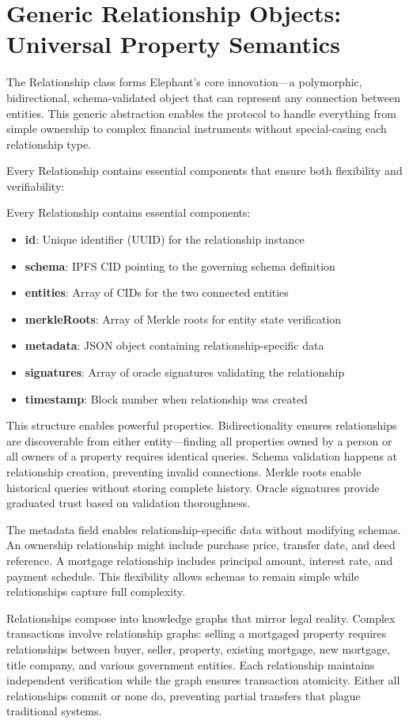 \section{Generic Relationship Objects: Universal Property Semantics}

The Relationship class forms Elephant's core innovation—a polymorphic, bidirectional, schema-validated object that can represent any connection between entities. This generic abstraction enables the protocol to handle everything from simple ownership to complex financial instruments without special-casing each relationship type.

Every Relationship contains essential components that ensure both flexibility and verifiability:

Every Relationship contains essential components:
\begin{itemize}
\item \textbf{id}: Unique identifier (UUID) for the relationship instance
\item \textbf{schema}: IPFS CID pointing to the governing schema definition
\item \textbf{entities}: Array of CIDs for the two connected entities
\item \textbf{merkleRoots}: Array of Merkle roots for entity state verification
\item \textbf{metadata}: JSON object containing relationship-specific data
\item \textbf{signatures}: Array of oracle signatures validating the relationship
\item \textbf{timestamp}: Block number when relationship was created
\end{itemize}

This structure enables powerful properties. Bidirectionality ensures relationships are discoverable from either entity—finding all properties owned by a person or all owners of a property requires identical queries. Schema validation happens at relationship creation, preventing invalid connections. Merkle roots enable historical queries without storing complete history. Oracle signatures provide graduated trust based on validation thoroughness.

The metadata field enables relationship-specific data without modifying schemas. An ownership relationship might include purchase price, transfer date, and deed reference. A mortgage relationship includes principal amount, interest rate, and payment schedule. This flexibility allows schemas to remain simple while relationships capture full complexity.

Relationships compose into knowledge graphs that mirror legal reality. Complex transactions involve relationship graphs: selling a mortgaged property requires relationships between buyer, seller, property, existing mortgage, new mortgage, title company, and various government entities. Each relationship maintains independent verification while the graph ensures transaction atomicity. Either all relationships commit or none do, preventing partial transfers that plague traditional systems.

